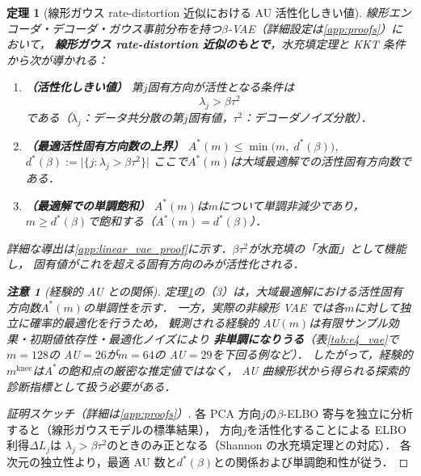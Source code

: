 \documentclass[11pt,a4paper]{jsarticle}
\newtheorem{theorem}{定理}
\newtheorem{remark}{注意}
\newcommand{\mknee}{m^{\mathrm{knee}}}
\begin{document}
\begin{theorem}[線形ガウス rate-distortion 近似における AU 活性化しきい値]\label{thm:linear_vae}
線形エンコーダ・デコーダ・ガウス事前分布を持つ$\beta$-VAE（詳細設定は\ref{app:proofs}）において，
\textbf{線形ガウス rate-distortion 近似のもとで}，水充填定理と KKT 条件から次が導かれる：

\begin{enumerate}
  \item \textbf{（活性化しきい値）} 第$j$固有方向が活性となる条件は
        \begin{equation}
          \lambda_j > \beta \tau^2 \label{eq:au_threshold}
        \end{equation}
        である（$\lambda_j$：データ共分散の第$j$固有値，$\tau^2$：デコーダノイズ分散）．
  \item \textbf{（最適活性固有方向数の上界）}
        $A^*(m) \leq \min\bigl(m,\; d^*(\beta)\bigr)$,\quad
        $d^*(\beta) := \bigl|\{j : \lambda_j > \beta\tau^2\}\bigr|$
        \newline
        ここで$A^*(m)$は大域最適解での活性固有方向数である．
  \item \textbf{（最適解での単調飽和）}
        $A^*(m)$は$m$について単調非減少であり，
        $m \geq d^*(\beta)$で飽和する（$A^*(m) = d^*(\beta)$）．
\end{enumerate}

\noindent
詳細な導出は\ref{app:linear_vae_proof}に示す．$\beta\tau^2$が水充填の「水面」として機能し，
固有値がこれを超える固有方向のみが活性化される．

\begin{remark}[経験的 AU との関係]
定理\ref{thm:linear_vae}の（3）は，大域最適解における活性固有方向数$A^*(m)$の単調性を示す．
一方，実際の非線形 VAE では各$m$に対して独立に確率的最適化を行うため，
観測される経験的 AU$(m)$は有限サンプル効果・初期値依存性・最適化ノイズにより
\textbf{非単調になりうる}（表\ref{tab:e4_vae}で$m=128$の AU$=26$が$m=64$の AU$=29$を下回る例など）．
したがって，経験的$\mknee$は$A^*$の飽和点の厳密な推定値ではなく，
AU 曲線形状から得られる探索的診断指標として扱う必要がある．
\end{remark}
\end{theorem}

\begin{proof}[証明スケッチ（詳細は\ref{app:proofs}）]
各 PCA 方向$j$の$\beta$-ELBO 寄与を独立に分析すると（線形ガウスモデルの標準結果），
方向$j$を活性化することによる ELBO 利得$\Delta L_j$は
$\lambda_j > \beta\tau^2$のときのみ正となる（Shannon の水充填定理との対応）．
各次元の独立性より，最適 AU 数と$d^*(\beta)$との関係および単調飽和性が従う．
\end{proof}
\end{document}
